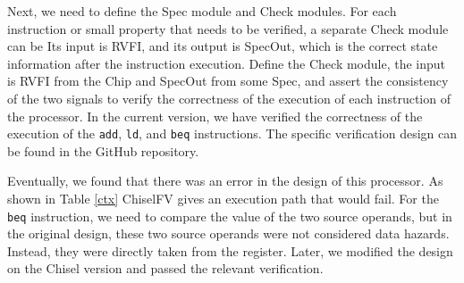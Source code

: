 \documentclass[conference]{IEEEtran}
\theoremstyle{definition}
\begin{document}
Next, we need to define the Spec module and Check modules. For each instruction or small property that needs to be verified, a separate Check module can be 
Its input is RVFI, and its output is SpecOut, which is the correct state information after the instruction execution. Define the Check module, the input is RVFI from the Chip and SpecOut from some Spec, and assert the consistency of the two signals to verify the correctness of the execution of each instruction of the processor.
In the current version, we have verified the correctness of the execution of the \verb|add|, \verb|ld|, and \verb|beq| instructions.
The specific verification design can be found in the GitHub repository.

Eventually, we found that there was an error in the design of this processor. 
As shown in Table \ref{ctx}
ChiselFV gives an execution path that would fail. For the \verb|beq| instruction, we need to compare the value of the two source operands, but in the original design, these two source operands were not considered data hazards. 
Instead, they were directly taken from the register. Later, we modified the design on the Chisel version and passed the relevant verification.
\end{document}
